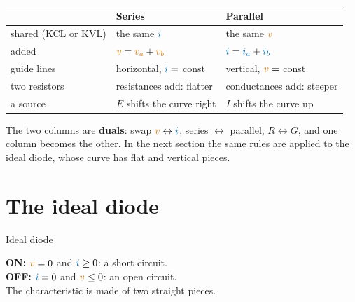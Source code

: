 \documentclass[11pt,a4paper]{article}
\newcommand{\Icol}[1]{\textcolor{ccur}{#1}}
\newcommand{\Vcol}[1]{\textcolor{cvolt}{#1}}
\newcommand{\ivax}[3]{%
  \draw[vax] (-#1,0) -- (#1,0) node[right=1pt, font=\scriptsize, text=cvolt] {$v$};
  \draw[vax] (0,-#2) -- (0,#2) node[above=1pt, font=\scriptsize, text=ccur] {$i$};
  \node[font=\scriptsize, text=metugray] at (0,-#2-0.35) {#3};}
\newcommand{\termtb}[1]{%
  \draw (0,#1) node[ocirc] {}; \draw (0,0) node[ocirc] {};
  \draw[iar] (-0.35,#1+0.05) -- (-0.35,#1-0.45); \node[font=\small, text=ccur, anchor=east] at (-0.4,#1-0.2) {$i$};
  \node[pol] at (-0.4,0.68*#1) {$+$}; \node[pol] at (-0.4,0.2*#1) {$-$};
  \node[font=\small, text=cvolt, anchor=east] at (-0.28,0.44*#1) {$v$};}
\begin{document}
\begin{center}
\small
\renewcommand{\arraystretch}{1.35}
\begin{tabular}{@{}lll@{}}
\toprule
 & \textbf{Series} & \textbf{Parallel}\\
\midrule
shared (KCL or KVL) & the same $\Icol{i}$ & the same $\Vcol{v}$\\
added & $\Vcol{v} = \Vcol{v_a} + \Vcol{v_b}$ & $\Icol{i} = \Icol{i_a} + \Icol{i_b}$\\
guide lines & horizontal, $\Icol{i} = $ const & vertical, $\Vcol{v} = $ const\\
two resistors & resistances add: flatter & conductances add: steeper\\
a source & $E$ shifts the curve right & $I$ shifts the curve up\\
\bottomrule
\end{tabular}
\end{center}
The two columns are \textbf{duals}: swap $\Vcol{v} \leftrightarrow \Icol{i}$, series
$\leftrightarrow$ parallel, $R \leftrightarrow G$, and one column becomes the other. In the next
section the same rules are applied to the ideal diode, whose curve has flat and vertical pieces.

\section{The ideal diode}

\begin{definitionbox}{Ideal diode}
\begin{minipage}[c]{0.16\linewidth}
\centering
{}
\end{minipage}\hfill
\begin{minipage}[c]{0.3\linewidth}
\centering
{}
\end{minipage}\hfill
\begin{minipage}[c]{0.48\linewidth}
\textbf{ON:} $\Vcol{v} = 0$ and $\Icol{i} \geq 0$: a short circuit.\\[4pt]
\textbf{OFF:} $\Icol{i} = 0$ and $\Vcol{v} \leq 0$: an open circuit.\\[4pt]
The characteristic is made of two straight pieces.
\end{minipage}
\end{definitionbox}
\end{document}
